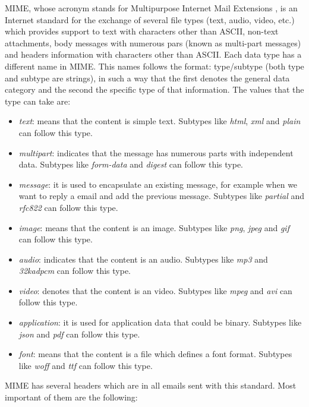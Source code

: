 MIME, whose acronym stands for Multipurpose Internet Mail Extensions \citep{wikimime, rfc2045}, is an Internet standard for the exchange of several file types (text, audio, video, etc.) which provides support to text with characters other than ASCII, non-text attachments, body messages with numerous pars (known as multi-part messages) and headers information with characters other than ASCII. Each data type has a different name in MIME. This names follows the format: type/subtype (both type and subtype are strings), in such a way that the first denotes the general data category and the second the specific type of that information. The values that the type can take are:

\begin{itemize}
	\item\textit{text}: means that the content is simple text. Subtypes like \textit{html}, \textit{xml} and \textit{plain} can follow this type.
	\item\textit{multipart}: indicates that the message has numerous parts with independent data. Subtypes like \textit{form-data} and \textit{digest} can follow this type.
	\item\textit{message}: it is used to encapsulate an existing message, for example when we want to reply a email and add the previous message. Subtypes like \textit{partial} and \textit{rfc822} can follow this type.
	\item\textit{image}: means that the content is an image. Subtypes like \textit{png}, \textit{jpeg} and \textit{gif} can follow this type.
	\item\textit{audio}: indicates that the content is an audio. Subtypes like \textit{mp3} and \textit{32kadpcm} can follow this type.
	\item\textit{video}: denotes that the content is an video. Subtypes like \textit{mpeg} and \textit{avi} can follow this type.
	\item\textit{application}: it is used for application data that could be binary. Subtypes like \textit{json} and \textit{pdf} can follow this type.
	\item\textit{font}: means that the content is a file which defines a font format. Subtypes like \textit{woff} and \textit{ttf} can follow this type.
\end{itemize}

MIME has several headers which are in all emails sent with this standard. Most important of them are the following:

